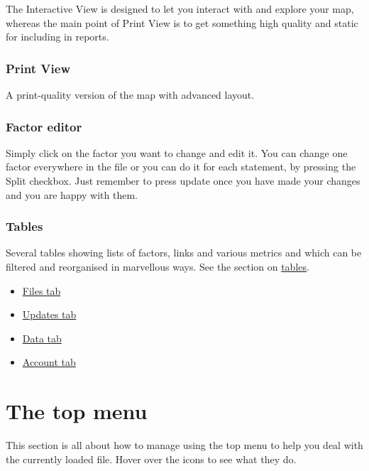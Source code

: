 \documentclass[
]{book}
\begin{document}
The Interactive View is designed to let you interact with and explore your map, whereas the main point of Print View is to get something high quality and static for including in reports.

\hypertarget{not}{%
\subsection{Print View}\label{not}}

A print-quality version of the map with advanced layout.

\hypertarget{no-not-this-one}{%
\subsection{Factor editor}\label{no-not-this-one}}

Simply click on the factor you want to change and edit it. You can change one factor everywhere in the file or you can do it for each statement, by pressing the Split checkbox. Just remember to press update once you have made your changes and you are happy with them.

\hypertarget{tables}{%
\subsection{Tables}\label{tables}}

Several tables showing lists of factors, links and various metrics and which can be filtered and reorganised in marvellous ways. See the section on \href{https://guide.causalmap.app/all-the-tables.html}{tables}.

\begin{itemize}
\item
  \protect\hyperlink{xfile-manager}{Files tab}
\item
  \protect\hyperlink{xupdates-tab}{Updates tab}
\item
  \protect\hyperlink{xdata-manager}{Data tab}
\item
  \protect\hyperlink{account-tab}{Account tab}
\end{itemize}

\hypertarget{xtop-menu}{%
\chapter{The top menu}\label{xtop-menu}}

This section is all about how to manage using the top menu to help you deal with the currently loaded file. Hover over the icons to see what they do.
\end{document}
